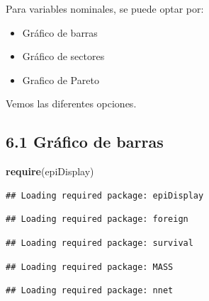 \documentclass[
]{article}
\newenvironment{Shaded}{\begin{snugshade}}{\end{snugshade}}
\newcommand{\FunctionTok}[1]{\textcolor[rgb]{0.13,0.29,0.53}{\textbf{#1}}}
\newcommand{\NormalTok}[1]{#1}
\providecommand{\tightlist}{%
  \setlength{\itemsep}{0pt}\setlength{\parskip}{0pt}}
\begin{document}
Para variables nominales, se puede optar por:

\begin{itemize}
\tightlist
\item
  Gráfico de barras
\item
  Gráfico de sectores
\item
  Grafico de Pareto
\end{itemize}

Vemos las diferentes opciones.

\hypertarget{gruxe1fico-de-barras}{%
\subsection{6.1 Gráfico de barras}\label{gruxe1fico-de-barras}}

\begin{Shaded}
\begin{Highlighting}[]
\FunctionTok{require}\NormalTok{(epiDisplay)}
\end{Highlighting}
\end{Shaded}

\begin{verbatim}
## Loading required package: epiDisplay
\end{verbatim}

\begin{verbatim}
## Loading required package: foreign
\end{verbatim}

\begin{verbatim}
## Loading required package: survival
\end{verbatim}

\begin{verbatim}
## Loading required package: MASS
\end{verbatim}

\begin{verbatim}
## Loading required package: nnet
\end{verbatim}
\end{document}
